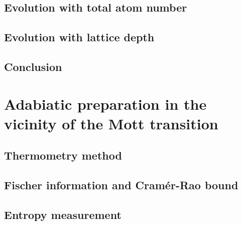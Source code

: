 \subsection{Evolution with total atom number}

\subsection{Evolution with lattice depth}

\subsection{Conclusion}

\section{Adabiatic preparation in the vicinity of the Mott transition}

\subsection{Thermometry method}

\subsection{Fischer information and Cramér-Rao bound}

\subsection{Entropy measurement}
